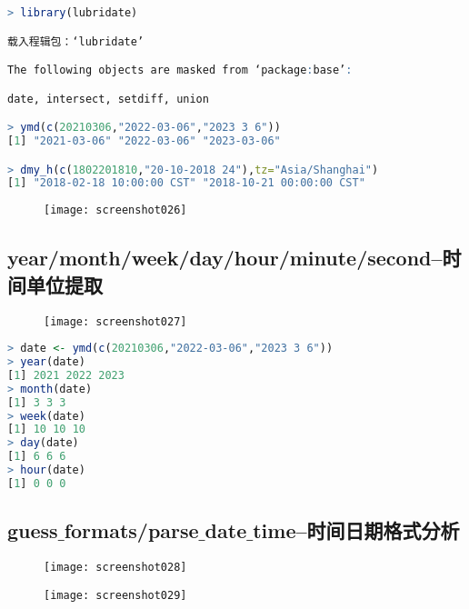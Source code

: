 \documentclass[11pt,a4paper,oneside]{book}
\begin{document}
\begin{lstlisting}[language=r]
> library(lubridate)

载入程辑包：‘lubridate’

The following objects are masked from ‘package:base’:

date, intersect, setdiff, union

> ymd(c(20210306,"2022-03-06","2023 3 6"))
[1] "2021-03-06" "2022-03-06" "2023-03-06"

> dmy_h(c(1802201810,"20-10-2018 24"),tz="Asia/Shanghai")
[1] "2018-02-18 10:00:00 CST" "2018-10-21 00:00:00 CST"
\end{lstlisting}
\begin{figure}[H]
	\centering
	\texttt{[image: screenshot026]}
\end{figure}

\subsection{year/month/week/day/hour/minute/second--时间单位提取}
\begin{figure}[H]
	\centering
	\texttt{[image: screenshot027]}
\end{figure}

\begin{lstlisting}[language=r]
> date <- ymd(c(20210306,"2022-03-06","2023 3 6"))
> year(date)
[1] 2021 2022 2023
> month(date)
[1] 3 3 3
> week(date)
[1] 10 10 10
> day(date)
[1] 6 6 6
> hour(date)
[1] 0 0 0
\end{lstlisting}

\subsection{guess$ \_ $formats/parse$ \_ $date$ \_ $time--时间日期格式分析}
\begin{figure}[H]
	\centering
	\texttt{[image: screenshot028]}
\end{figure}
\begin{figure}[H]
	\centering
	\texttt{[image: screenshot029]}
\end{figure}
\end{document}

